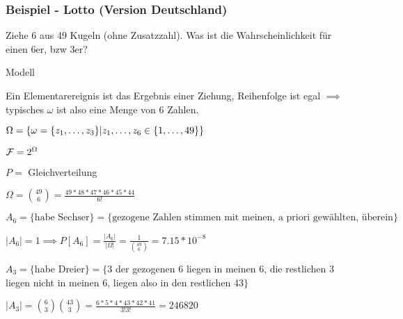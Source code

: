 \subsubsection{Beispiel - Lotto (Version Deutschland)}
Ziehe 6 aus 49 Kugeln (ohne Zusatzzahl). Was ist die Wahrscheinlichkeit für einen 6er, bzw 3er?\\
\enumstart
	\item Modell
	\enumstart
		\item Ein Elementarereignis ist das Ergebnis einer Ziehung, Reihenfolge ist egal $\implies$ typisches $\omega$ ist also eine Menge von 6 Zahlen.
		\item $\Omega = \{\omega = \{z_1, \mathellipsis, z_3\} | z_1, \mathellipsis, z_6 \in \{1, \mathellipsis, 49\}\}$
		\item $\mathcal{F} = 2^\Omega$
		\item $P =$ Gleichverteilung
		\item $\Omega = \binom{49}{6} = \frac{49*48*47*46*45*44}{6!}$
		\item $A_6 = \{\text{habe Sechser}\} = \{\text{gezogene Zahlen stimmen mit meinen, a priori gewählten, überein}\}$
		\item $|A_6| = 1 \implies P[A_6] = \frac{|A_6|}{|\Omega|} = \frac{1}{\binom{49}{6}} = 7.15*10^{-8}$
		\item $A_3 = \{$habe Dreier$\} = \{$3 der gezogenen 6 liegen in meinen 6, die restlichen 3 liegen nicht in meinen 6, liegen also in den restlichen 43$\}$
		\item $|A_3| = \binom{6}{3}\binom{43}{3} = \frac{6*5*4*43*42*41}{3!3!} = 246820$
	\enumend
\enumend

